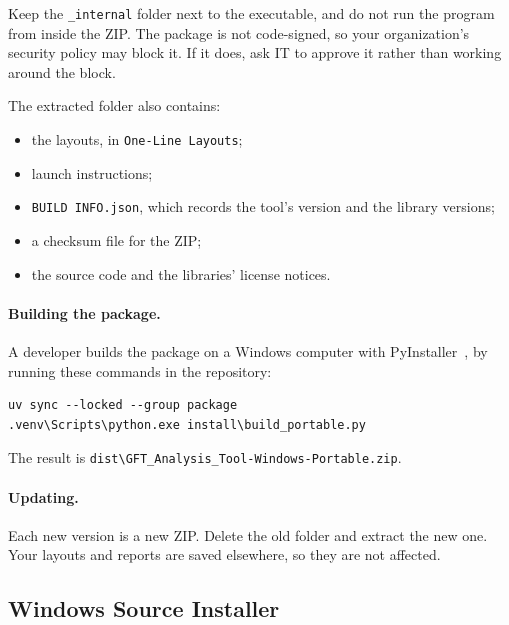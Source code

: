 \begin{note}
Keep the \texttt{\_internal} folder next to the executable, and do not run the program
from inside the ZIP. The package is not code-signed, so your organization's security
policy may block it. If it does, ask IT to approve it rather than working around the
block.
\end{note}

The extracted folder also contains:
\begin{itemize}
  \item the layouts, in \texttt{One-Line Layouts};
  \item launch instructions;
  \item \texttt{BUILD INFO.json}, which records the tool's version and the library
        versions;
  \item a checksum file for the ZIP;
  \item the source code and the libraries' license notices.
\end{itemize}

\paragraph{Building the package.} A developer builds the package on a Windows
computer with PyInstaller~\cite{pyinstaller}, by running these commands in the
repository:

\begin{lstlisting}
uv sync --locked --group package
.venv\Scripts\python.exe install\build_portable.py
\end{lstlisting}

The result is \texttt{dist\textbackslash GFT\_Analysis\_Tool-Windows-Portable.zip}.

\paragraph{Updating.} Each new version is a new ZIP. Delete the old folder and extract
the new one. Your layouts and reports are saved elsewhere, so they are not affected.

\subsection{Windows Source Installer}

